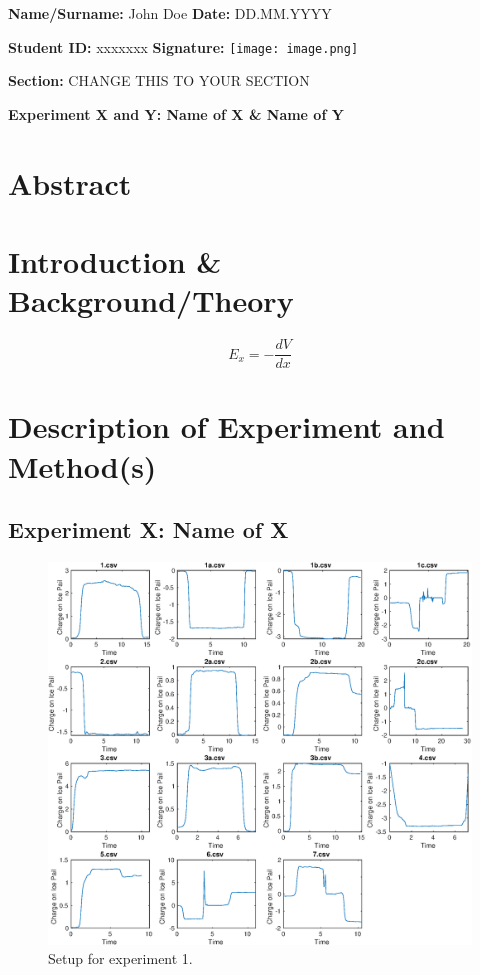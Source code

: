 \documentclass[11pt]{article}
\begin{document}
\textbf{Name/Surname:} John Doe \hfill \textbf{Date:} DD.MM.YYYY %

\textbf{Student ID:} xxxxxxx \hfill \textbf{Signature:}
    \texttt{[image: image.png]} %


\textbf{Section:} CHANGE THIS TO YOUR SECTION

\begin{center}
  \textbf{Experiment X and Y: Name of X \& Name of Y}
\end{center}

\section{Abstract}


\section{Introduction \& Background/Theory}

\begin{equation}
    E_x=-\frac{dV}{dx}
    \label{eq:eqtoef}
\end{equation}

\section{Description of Experiment and Method(s)}
\subsection{Experiment X: Name of X}

\begin{multicols}{2}

  \lipsum[1]

  \columnbreak
\begin{figure}[H]
    \centering
    \includegraphics[width=0.5\linewidth]{figure1.eps}
    \caption{Setup for experiment 1.}
    \label{fig:setupexp1}
\end{figure}
\end{multicols}
\end{document}
